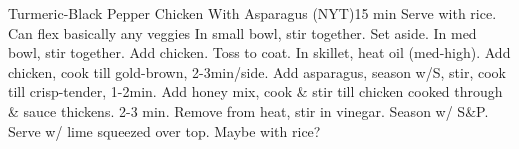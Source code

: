 \documentclass[a6paper,landscape]{article}
\begin{document}
\begin{recipe}{Turmeric-Black Pepper Chicken With Asparagus        (NYT)}{15 min}{}
  \freeform Serve with rice. Can flex basically any veggies
  In small bowl, stir together. Set aside.
  In med bowl, stir together. Add chicken. Toss to coat.
  In skillet, heat oil (med-high). Add chicken, cook till gold-brown, 2-3min/side.
  Add asparagus, season w/S, stir, cook till crisp-tender, 1-2min.
  \newstep Add honey mix, cook \& stir till chicken cooked through \& sauce thickens. 2-3 min.
  Remove from heat, stir in vinegar. Season w/ S\&P.
  Serve w/ lime squeezed over top. Maybe with rice?
  \end{recipe}
\end{document}
